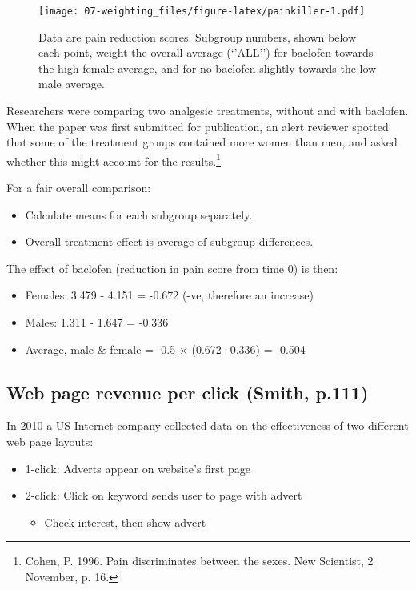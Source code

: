 \documentclass[
  10pt,
  b5paper]{book}
\providecommand{\tightlist}{%
  \setlength{\itemsep}{0pt}\setlength{\parskip}{0pt}}
\begin{document}
\begin{figure}
\centering
\texttt{[image: 07-weighting\_files/figure-latex/painkiller-1.pdf]}
\caption{\label{fig:painkiller}Data are pain reduction scores. Subgroup numbers, shown
below each point, weight the overall average (`'ALL'') for
baclofen towards the high female average, and for no baclofen
slightly towards the low male average.}
\end{figure}

Researchers were comparing two
analgesic treatments, without and with baclofen. When the paper was
first submitted for publication, an alert reviewer spotted that some
of the treatment groups contained more women than men, and asked
whether this might account for the
results.\footnote{Cohen, P. 1996. Pain discriminates between the
sexes.  New Scientist, 2 November, p. 16.}

For a fair overall comparison:

\begin{itemize}
\tightlist
\item
  Calculate means for each subgroup separately.
\item
  Overall treatment effect is average of subgroup differences.
\end{itemize}

The effect of baclofen (reduction in pain score from time 0) is then:

\begin{itemize}
\tightlist
\item
  Females: 3.479 - 4.151 = -0.672 (-ve, therefore an increase)
\item
  Males: 1.311 - 1.647 = -0.336
\item
  Average, male \& female = -0.5 \(\times\) (0.672+0.336) = -0.504
\end{itemize}

\hypertarget{web-page-revenue-per-click-smith-p.111}{%
\subsection*{Web page revenue per click (Smith, p.111)}\label{web-page-revenue-per-click-smith-p.111}}

In 2010 a US Internet company collected data on the effectiveness
of two different web page layouts:

\begin{itemize}
\tightlist
\item
  1-click: Adverts appear on website's first page
\item
  2-click: Click on keyword sends user to page with advert

  \begin{itemize}
  \tightlist
  \item
    Check interest, then show advert
  \end{itemize}
\end{itemize}
\end{document}
